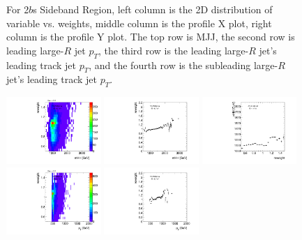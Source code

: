 \begin{figure}[htbp!]
\begin{center}
\caption{For 2$b$s Sideband Region, left column is the 2D distribution of variable vs. weights, middle column is the profile X plot, right column is the profile Y plot. The top row is MJJ, the second row is leading large-$R$ jet $p_{T}$, the third row is the leading large-$R$ jet's leading track jet $p_{T}$, and the fourth row is the subleading large-$R$ jet's leading track jet $p_{T}$.}
\label{fig:app-reweight-dist-2b-SB}
\end{center}
\end{figure}


\begin{figure}[htbp!]
\begin{center}
\includegraphics[width=0.32\textwidth,angle=-90]{figures/boosted/AppendixReweight/Weights/3Trk_Sideband_mHH_l_weight.pdf}
\includegraphics[width=0.32\textwidth,angle=-90]{figures/boosted/AppendixReweight/Weights/3Trk_Sideband_mHH_l_weight_profx.pdf}
\includegraphics[width=0.32\textwidth,angle=-90]{figures/boosted/AppendixReweight/Weights/3Trk_Sideband_mHH_l_weight_profy.pdf}\\
\includegraphics[width=0.32\textwidth,angle=-90]{figures/boosted/AppendixReweight/Weights/3Trk_Sideband_leadHCand_Pt_m_weight.pdf}
\includegraphics[width=0.32\textwidth,angle=-90]{figures/boosted/AppendixReweight/Weights/3Trk_Sideband_leadHCand_Pt_m_weight_profx.pdf}

\end{center}
\end{figure}

